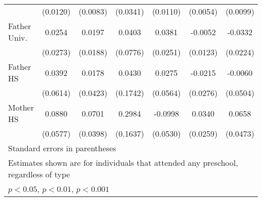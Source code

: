 \begin{table}[htbp]
\begin{tabular}{l*{6}{c}}
            &    (0.0120)         &    (0.0083)         &    (0.0341)         &    (0.0110)         &    (0.0054)         &    (0.0099)         \\
\addlinespace
Father Univ.&      0.0254         &      0.0197         &      0.0403         &      0.0381         &     -0.0052         &     -0.0332         \\
            &    (0.0273)         &    (0.0188)         &    (0.0776)         &    (0.0251)         &    (0.0123)         &    (0.0224)         \\
\addlinespace
Father HS   &      0.0392         &      0.0178         &      0.0430         &      0.0275         &     -0.0215         &     -0.0060         \\
            &    (0.0614)         &    (0.0423)         &    (0.1742)         &    (0.0564)         &    (0.0276)         &    (0.0504)         \\
\addlinespace
Mother HS   &      0.0880         &      0.0701         &      0.2984         &     -0.0998         &      0.0340         &      0.0658         \\
            &    (0.0577)         &    (0.0398)         &    (0.1637)         &    (0.0530)         &    (0.0259)         &    (0.0473)         \\
\bottomrule
\multicolumn{7}{l}{\footnotesize Standard errors in parentheses}\\
\multicolumn{7}{l}{\footnotesize Estimates shown are for individuals that attended any preschool, regardless of type}\\
\multicolumn{7}{l}{\footnotesize \sym{*} \(p<0.05\), \sym{**} \(p<0.01\), \sym{***} \(p<0.001\)}\\
\end{tabular}
\end{table}
